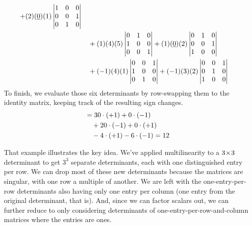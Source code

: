 \begin{example}
\begin{align*}
  +(2)(\underline{0})(1)\begin{vmatrix}
               1  &0  &0  \\
               0  &0  &1  \\
               0  &1  &0
            \end{vmatrix}                     \\
  &\quad\hbox{}+(1)(4)(5)\begin{vmatrix}
               0  &1  &0  \\
               1  &0  &0  \\
               0  &0  &1
            \end{vmatrix}
  +(1)(\underline{0})(2)\begin{vmatrix}
               0  &1  &0  \\
               0  &0  &1  \\
               1  &0  &0
            \end{vmatrix}                       \\
  &\quad\hbox{}+(-1)(4)(1)\begin{vmatrix}
               0  &0  &1  \\
               1  &0  &0  \\
               0  &1  &0
            \end{vmatrix}
  +(-1)(3)(2)\begin{vmatrix}
               0  &0  &1  \\
               0  &1  &0  \\
               1  &0  &0
            \end{vmatrix}                       
\end{align*}
To finish, we evaluate those six determinants by row-swapping them 
to the identity matrix,
keeping track of the resulting sign changes.
\begin{align*}
  &=30\cdot (+1)+0\cdot (-1)  \\
  &\quad\hbox{}+20\cdot (-1)+0\cdot (+1) \\
  &\quad \hbox{}-4\cdot (+1)-6\cdot (-1)=12
\end{align*}
\end{example}

That example illustrates the key idea.
We've applied multilinearity to a $3 \! \times \! 3$ determinant to get 
$3^3$ separate determinants, each with one distinguished entry per row.
We can drop most of these new determinants because the matrices are singular,
with one row a multiple of another.
We are left with the one-entry-per-row determinants 
also having only one entry per column (one entry from the original determinant,
that is).
And, since we can factor scalars out, we can further reduce to
only considering determinants of
one-entry-per-row-and-column matrices where the entries are ones.

